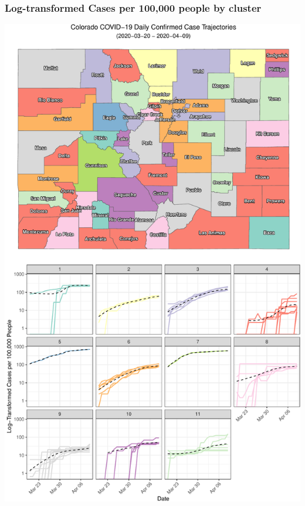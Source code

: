 \documentclass[]{article}
\begin{document}
\hypertarget{log-transformed-cases-per-100000-people-by-cluster}{%
\subsubsection{Log-transformed Cases per 100,000 people by
cluster}\label{log-transformed-cases-per-100000-people-by-cluster}}

\includegraphics{figs/county-clusters--log-1.pdf}
\end{document}
